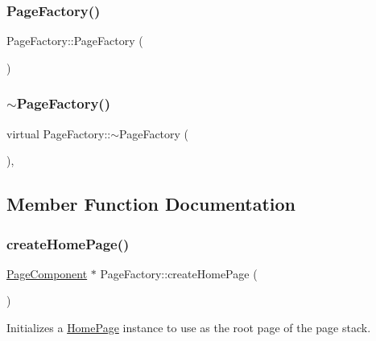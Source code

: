 \subsubsection{\texorpdfstring{Page\+Factory()}{PageFactory()}}
{\footnotesize\ttfamily Page\+Factory\+::\+Page\+Factory (\begin{DoxyParamCaption}{ }\end{DoxyParamCaption})\hspace{0.3cm}{\ttfamily [inline]}}

\mbox{\label{classPageFactory_a62d5a5ddeff01c924c98556cf87aa64d}} 
\subsubsection{\texorpdfstring{$\sim$\+Page\+Factory()}{~PageFactory()}}
{\footnotesize\ttfamily virtual Page\+Factory\+::$\sim$\+Page\+Factory (\begin{DoxyParamCaption}{ }\end{DoxyParamCaption})\hspace{0.3cm}{\ttfamily [inline]}, {\ttfamily [virtual]}}



\subsection{Member Function Documentation}
\mbox{\label{classPageFactory_a08f1a7c80349bcd20a6aadeb75c4f9ac}} 
\subsubsection{\texorpdfstring{create\+Home\+Page()}{createHomePage()}}
{\footnotesize\ttfamily \mbox{\hyperlink{classPageComponent}{Page\+Component}} $\ast$ Page\+Factory\+::create\+Home\+Page (\begin{DoxyParamCaption}{ }\end{DoxyParamCaption})}

Initializes a \mbox{\hyperlink{classHomePage}{Home\+Page}} instance to use as the root page of the page stack. \mbox{\label{classPageFactory_aa00448c458c43a9931023c30b3821670}} 
